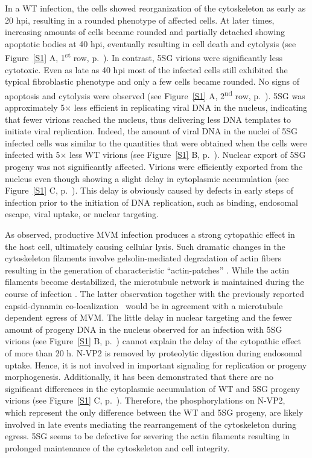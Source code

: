 In a WT infection, the cells showed reorganization of the cytoskeleton as early as 20 hpi, resulting in a rounded phenotype of affected cells. At later times, increasing amounts of cells became rounded and partially detached showing apoptotic bodies at 40 hpi, eventually resulting in cell death and cytolysis (see Figure~\ref{S1} A, 1\textsuperscript{st} row, p.~\pageref{S1}). In contrast, 5SG virions were significantly less cytotoxic. Even as late as 40 hpi most of the infected cells still exhibited the typical fibroblastic phenotype and only a few cells became rounded. No signs of apoptosis and cytolysis were observed (see Figure~\ref{S1} A, 2\textsuperscript{nd} row, p.~\pageref{S1}). 5SG was approximately 5$\times$ less efficient in replicating viral DNA in the nucleus, indicating that fewer virions reached the nucleus, thus delivering less DNA templates to initiate viral replication. Indeed, the amount of viral DNA in the nuclei of 5SG infected cells was similar to the quantities that were obtained when the cells were infected with 5$\times$ less WT virions (see Figure~\ref{S1} B, p.~\pageref{S1}). Nuclear export of 5SG progeny was not significantly affected. Virions were efficiently exported from the nucleus even though showing a slight delay in cytoplasmic accumulation (see Figure~\ref{S1} C, p.~\pageref{S1}). This delay is obviously caused by defects in early steps of infection prior to the initiation of DNA replication, such as binding, endosomal escape, viral uptake, or nuclear targeting.


As observed, productive MVM infection produces a strong cytopathic effect in the host cell, ultimately causing cellular lysis. Such dramatic changes in the cytoskeleton filaments involve gelsolin-mediated degradation of actin fibers resulting in the generation of characteristic ``actin-patches'' \cite{pmid18704167}. While the actin filaments become destabilized, the microtubule network is maintained during the course of infection \cite{pmid15582663}. The latter observation together with the previously reported capsid-dynamin co-localization~\cite{pmid18704167} would be in agreement with a microtubule dependent egress of MVM. The little delay in nuclear targeting and the fewer amount of progeny DNA in the nucleus observed for an infection with 5SG virions (see Figure~\ref{S1} B, p.~\pageref{S1}) cannot explain the delay of the cytopathic effect of more than 20 h. N-VP2 is removed by proteolytic digestion during endosomal uptake. Hence, it is not involved in important signaling for replication or progeny morphogenesis. Additionally, it has been demonstrated that there are no significant differences in the cytoplasmic accumulation of WT and 5SG progeny virions (see Figure~\ref{S1} C, p.~\pageref{S1}). Therefore, the phosphorylations on N-VP2, which represent the only difference between the WT and 5SG progeny, are likely involved in late events mediating the rearrangement of the cytoskeleton during egress. 5SG seems to be defective for severing the actin filaments resulting in prolonged maintenance of the cytoskeleton and cell integrity. 



